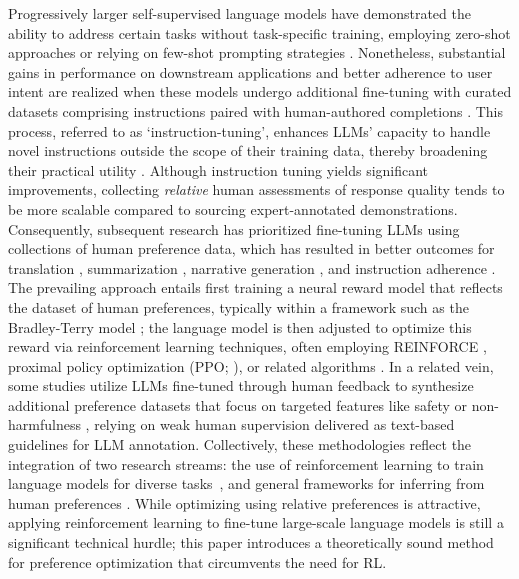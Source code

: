 Progressively larger self-supervised language models have demonstrated the ability to address certain tasks without task-specific training, employing zero-shot approaches \citep{radford2019language} or relying on few-shot prompting strategies \citep{gpt3,megatron,chowdhery2022palm}. Nonetheless, substantial gains in performance on downstream applications and better adherence to user intent are realized when these models undergo additional fine-tuning with curated datasets comprising instructions paired with human-authored completions \citep{mishra-etal-2022-cross,sanh2022multitask,chung2022scaling,thoppilan2022lamda}. This process, referred to as `instruction-tuning', enhances LLMs’ capacity to handle novel instructions outside the scope of their training data, thereby broadening their practical utility \citep{chung2022scaling}. Although instruction tuning yields significant improvements, collecting \textit{relative} human assessments of response quality tends to be more scalable compared to sourcing expert-annotated demonstrations. Consequently, subsequent research has prioritized fine-tuning LLMs using collections of human preference data, which has resulted in better outcomes for translation \citep{kreutzer-etal-2018-reliability}, summarization \citep{stiennon2022learning,ziegler2020finetuning}, narrative generation \citep{ziegler2020finetuning}, and instruction adherence \citep{ouyang2022training,ramamurthy2023is}. The prevailing approach entails first training a neural reward model that reflects the dataset of human preferences, typically within a framework such as the Bradley-Terry model \citep{bradley1952rankanalysis}; the language model is then adjusted to optimize this reward via reinforcement learning techniques, often employing REINFORCE \citep{williams1992reinforce}, proximal policy optimization (PPO; \cite{schulman2017proximal}), or related algorithms \citep{ramamurthy2023is}. In a related vein, some studies utilize LLMs fine-tuned through human feedback to synthesize additional preference datasets that focus on targeted features like safety or non-harmfulness \citep{bai2022constitutional}, relying on weak human supervision delivered as text-based guidelines for LLM annotation. Collectively, these methodologies reflect the integration of two research streams: the use of reinforcement learning to train language models for diverse tasks~\citep{Ranzato2015SequenceLT,paulus2018a,wu2018learning}, and general frameworks for inferring from human preferences \citep{christiano2017deep,kupcsik2018learning}. While optimizing using relative preferences is attractive, applying reinforcement learning to fine-tune large-scale language models is still a significant technical hurdle; this paper introduces a theoretically sound method for preference optimization that circumvents the need for RL.

